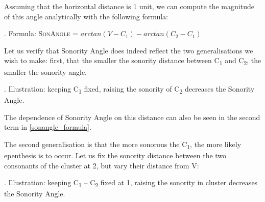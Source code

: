 \documentclass[12pt]{article}
\begin{document}
Assuming that the horizontal distance is 1 unit, we can compute the magnitude of this angle analytically with the following formula:

\ex. \label{sonangle_formula} Formula: \textsc{SonAngle} = $arctan(V-C_1) - arctan(C_2-C_1)$

Let us verify that {\sc Sonority Angle} does indeed reflect the two generalisations we wish to make: first, that the smaller the sonority distance between C\textsubscript{1} and C\textsubscript{2}, the smaller the sonority angle.

\ex. Illustration: keeping C\textsubscript{1} fixed, raising the sonority of C\textsubscript{2} decreases the {\sc Sonority Angle}.

\vspace{-5em}
\begin{center}
\end{center}

The dependence of {\sc Sonority Angle} on this distance can also be seen in the second term in \ref{sonangle_formula}.

The second generalisation is that the more sonorous the C\textsubscript{1}, the more likely
epenthesis is to occur. Let us fix the sonority distance between the two consonants of the cluster at 2, but vary their distance from V: 

\newpage

\ex. Illustration: keeping C\textsubscript{1} -- C\textsubscript{2} fixed at 1, raising the sonority in cluster decreases the {\sc Sonority Angle}.
\end{document}
